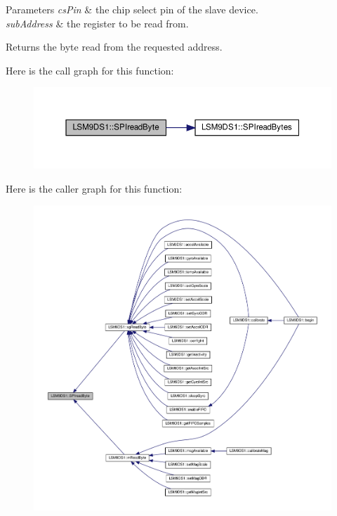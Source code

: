 \begin{DoxyParams}{Parameters}
{\em cs\+Pin} & the chip select pin of the slave device. \\
\hline
{\em sub\+Address} & the register to be read from. \\
\hline
\end{DoxyParams}
\begin{DoxyReturn}{Returns}
the byte read from the requested address. 
\end{DoxyReturn}
Here is the call graph for this function\+:\nopagebreak
\begin{figure}[H]
\begin{center}
\leavevmode
\includegraphics[width=350pt]{classLSM9DS1_a6f0f50bb5e9b702d5a19c7441a3f9d8b_cgraph}
\end{center}
\end{figure}
Here is the caller graph for this function\+:\nopagebreak
\begin{figure}[H]
\begin{center}
\leavevmode
\includegraphics[width=350pt]{classLSM9DS1_a6f0f50bb5e9b702d5a19c7441a3f9d8b_icgraph}
\end{center}
\end{figure}
\mbox{\label{classLSM9DS1_a26c0f164454eba84e6486033b7061d11}} 
